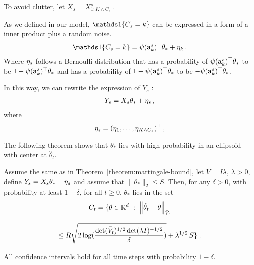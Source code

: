 To avoid clutter, let $X_s = X^s_{1 : K \wedge C_s}\,.$

As we defined in our model, $\I{C_s=k}$ can be expressed in a form of a inner product plus a random noise.
\begin{align*}
  \I{C_s=k} = \psi(\rnd{a}^s_k)^\top \theta_* + \rnd{\eta}_k \,.
\end{align*}
Where $ \mathbf{\eta}_s $ follows a Bernoulli distribution that
has a probability of $\psi(\mathbf{a}^s_k)^\top \theta_*$ to be $1 - \psi(\mathbf{a}^s_k)^\top \theta_*$
and has a probability of $1 - \psi(\mathbf{a}^s_k)^\top \theta_*$ to be $-\psi(\mathbf{a}^s_k)^\top \theta_*$.

In this way, we can rewrite the expression of $Y_s$ :
\begin{align*}
  Y_s = X_s \theta_* + \mathbf{\eta}_s \,,
\end{align*}
where
\begin{align*}
  \mathbf{\eta}_s = (\mathbf{\eta}_1, \dots, \mathbf{\eta}_{K \wedge C_s})^\top \,,
\end{align*}

The following theorem shows that $\theta_*$ lies with high probability in an
ellipsoid with center at $\hat{\theta}_t$.

\begin{theorem}
\label{theorem:confidence-ellipsoid}
Assume the same as in Theorem~\ref{theorem:martingale-bound}, let $V = I \lambda$, $\lambda > 0$, define
$Y_s = X_s \theta_* + \mathbf{\eta}_s$ and assume that $\|\theta_*\|_2 \le S$. Then, for any $\delta > 0$, with probability at least $1-\delta$,
for all $t \ge 0$, $\theta_*$ lies in the set
$$
C_t = \{ \theta \in \mathbb{R}^d ~:~ \left\|\hat{\theta}_t -  \theta\right\|_{\bar{V}_{t}}
$$

$$
\le R \sqrt{2 \log( \frac{\det (\bar{V}_{t})^{1/2}\det(\lambda I)^{-1/2}}{\delta} )} + \lambda^{1/2}\, S \} \; .
$$

All confidence intervals hold for all time steps with probability $1-\delta$.

\end{theorem}

